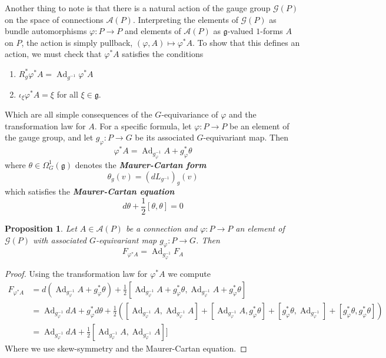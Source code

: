 \documentclass[psamsfonts, 12pt]{amsart}
\newtheorem{prop}[thm]{Proposition}
\theoremstyle{definition}
\theoremstyle{remark}
\newcommand{\ib}[1]{\textbf{\textit{#1}}}
\newcommand{\g}{\mathfrak{g}}
\newcommand{\inv}{^{-1}}
\DeclareMathOperator{\Ad}{Ad}
\begin{document}
Another thing to note is that there is a natural action of the gauge group
$\mathscr{G}(P)$ on the space of connections $\mathscr{A}(P)$. Interpreting the
elements of $\mathscr{G}(P)$ as bundle automorphisms $\varphi : P \to P$ and
elements of $\mathscr{A}(P)$ as $\g$-valued $1$-forms $A$ on $P$, the action
is simply pullback, $(\varphi,A) \mapsto \varphi^*A$. To show that
this defines an action, we must check that $\varphi^*A$ satisfies the conditions
%
\begin{enumerate}
  \item $R_g^*\varphi^*A = \Ad_{g\inv} \varphi^*A$
  \item $\iota_\xi \varphi^*A = \xi$ for all $\xi \in \g$.
\end{enumerate}
%
Which are all simple consequences of the $G$-equivariance of $\varphi$ and
the transformation law for $A$. For a specific formula, let
$\varphi : P \to P$ be an element of the gauge group, and let
$g_\varphi : P \to G$ be its associated $G$-equivariant map. Then
\[
\varphi^*A = \Ad_{g_\varphi\inv} A + g_\varphi^*\theta
\]
where $\theta \in \Omega^1_G(\g)$ denotes the \ib{Maurer-Cartan form}
\[
\theta_g(v) = (dL_{g\inv})_g(v)
\]
which satisfies the \ib{Maurer-Cartan equation}
\[
d\theta + \frac{1}{2}[\theta,\theta] = 0
\]
%
\begin{prop}
Let $A \in \mathscr{A}(P)$ be a connection and $\varphi : P \to P$ an element
of $\mathscr{G}(P)$ with associated $G$-equivariant map $g_\varphi : P \to G$.
Then
\[
F_{\varphi^*A} = \Ad_{g_\varphi\inv} F_A
\]
\end{prop}
%
\begin{proof}
Using the transformation law for $\varphi^*A$ we compute
\begin{align*}
F_{\varphi^*A} &= d(\Ad_{g_\varphi\inv} A + g_\varphi^*\theta)
+ \frac{1}{2}[\Ad_{g_\varphi\inv} A + g_\varphi^*\theta,
\Ad_{g_\varphi\inv} A + g_\varphi^*\theta] \\
&= \Ad_{g_\varphi\inv}dA + g_\varphi^*d\theta + \frac{1}{2}
\left([\Ad_{g_\varphi\inv}A, \Ad_{g_\varphi\inv} A] + [\Ad_{g_\varphi\inv} A,
g_\varphi^*\theta] + [g^*_\varphi\theta, \Ad_{g_\varphi\inv}]
+ [g_\varphi^*\theta,g_\varphi^*\theta] \right) \\
&= \Ad_{g_\varphi\inv} dA + \frac{1}{2}[\Ad_{g_\varphi\inv}A, \Ad_{g_\varphi\inv} A]]
\end{align*}
Where we use skew-symmetry and the Maurer-Cartan equation.
\end{proof}
%
\end{document}
